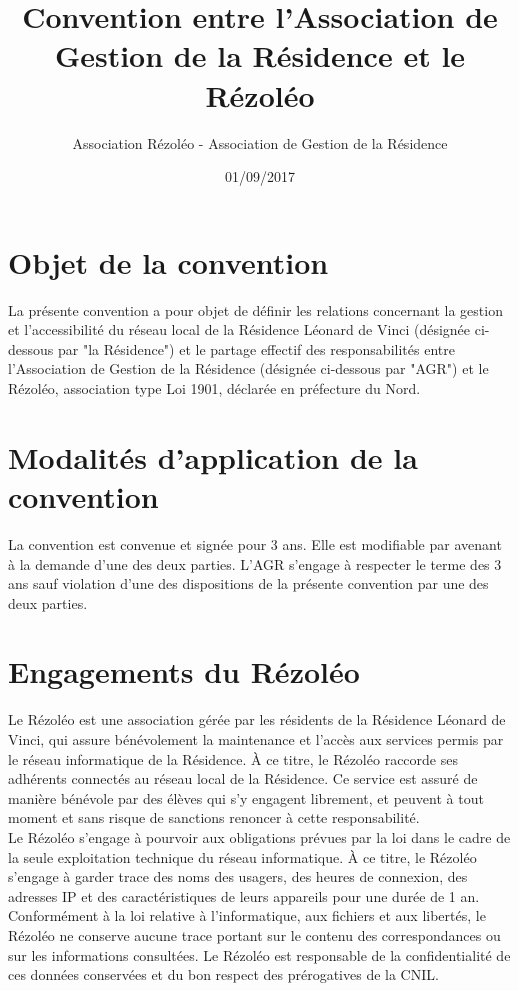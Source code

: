 \documentclass[12pt]{constitution}
\begin{document}
\title{Convention entre l'Association de Gestion de la Résidence et le Rézoléo}
\author{Association Rézoléo - Association de Gestion de la Résidence}
\date{01/09/2017}
\maketitle

\section{Objet de la convention}

    La présente convention a pour objet de définir les relations concernant la gestion et l'accessibilité du réseau local de la Résidence Léonard de Vinci (désignée ci-dessous par "la Résidence") et le partage effectif des responsabilités entre l'Association de Gestion de la Résidence (désignée ci-dessous par "AGR") et le Rézoléo, association type Loi 1901, déclarée en préfecture du Nord.


\section{Modalités d'application de la convention}

    La convention est convenue et signée pour 3 ans. Elle est modifiable par avenant à la demande d'une des deux parties. L'AGR s'engage à respecter le terme des 3 ans sauf violation d'une des dispositions de la présente convention par une des deux parties.


\section{Engagements du Rézoléo}

    Le Rézoléo est une association gérée par les résidents de la Résidence Léonard de Vinci, qui assure bénévolement la maintenance et l'accès aux services permis par le réseau informatique de la Résidence. À ce titre, le Rézoléo raccorde ses adhérents connectés au réseau local de la Résidence. Ce service est assuré de manière bénévole par des élèves qui s'y engagent librement, et peuvent à tout moment et sans risque de sanctions renoncer à cette responsabilité.\\


    Le Rézoléo s'engage à pourvoir aux obligations prévues par la loi dans le cadre de la seule exploitation technique du réseau informatique. À ce titre, le Rézoléo s'engage à garder trace des noms des usagers, des heures de connexion, des adresses IP et des caractéristiques de leurs appareils pour une durée de 1 an. Conformément à la loi relative à l'informatique, aux fichiers et aux libertés, le Rézoléo ne conserve aucune trace portant sur le contenu des correspondances ou sur les informations consultées. Le Rézoléo est responsable de la confidentialité de ces données conservées et du bon respect des prérogatives de la CNIL.\\
\end{document}
